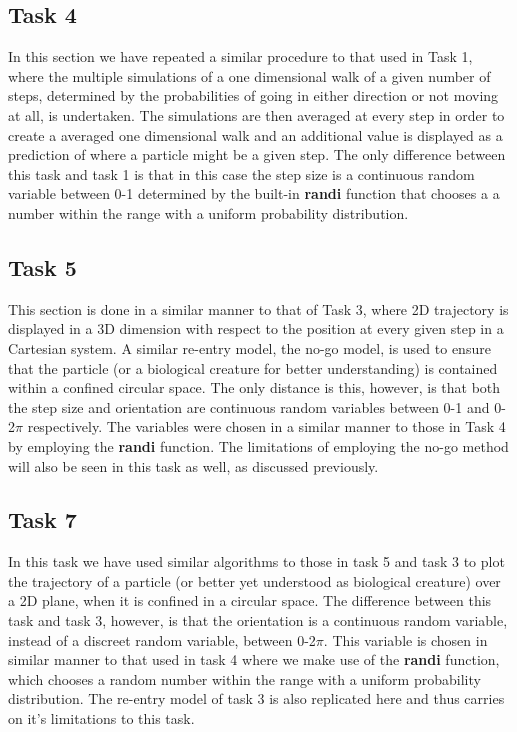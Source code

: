 \documentclass{article}
\begin{document}
\subsection{Task 4}
In this section we have repeated a similar procedure to that used in Task 1, where the multiple simulations of a one dimensional walk of a given number of steps, determined by the probabilities of going in either direction or not moving at all, is undertaken. The simulations are then averaged at every step in order to create a averaged one dimensional walk and an additional value is displayed as a prediction of where a particle might be a given step. The only difference between this task and task 1 is that in this case the step size is a continuous random variable between 0-1 determined by the built-in \textbf{randi} function that chooses a a number within the range with a uniform probability distribution.
\subsection{Task 5}
This section is done in a similar manner to that of Task 3, where 2D trajectory is displayed in a 3D dimension with respect to the position at every given step in a Cartesian system. A similar re-entry model, the no-go model, is used to ensure that the particle (or a biological creature for better understanding) is contained within a confined circular space. The only distance is this, however, is that both the step size and orientation are continuous random variables between 0-1 and 0-2$\pi$ respectively. The variables were chosen in a similar manner to those in Task 4 by employing the \textbf{randi} function. The limitations of employing the no-go method will also be seen in this task as well, as discussed previously.
\subsection{Task 7}
In this task we have used similar algorithms to those in task 5 and task 3 to plot the trajectory of a particle (or better yet understood as biological creature) over a 2D plane, when it is confined in a circular space. The difference between this task and task 3, however, is that the orientation is a continuous random variable, instead of a discreet random variable, between 0-2$\pi$. This variable is chosen in  similar manner to that used in task 4 where we make use of the \textbf{randi} function, which chooses a random number within the range with a uniform probability distribution. The re-entry model of task 3 is also replicated here and thus carries on it's limitations to this task.  
\end{document}
